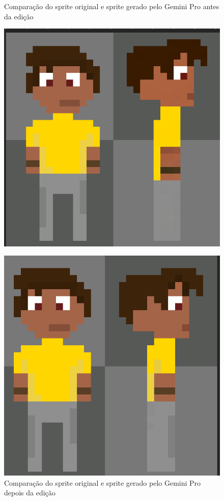\begin{figure}[htbp]
    \centering
    \begin{minipage}{0.45\textwidth}
        \centering
        \caption{\small Comparação do sprite original e sprite gerado pelo Gemini Pro antes da edição}
        \label{fig:pixelLabFixSideViewComparaAntes}
        \includegraphics[width=1\linewidth]{figs/pixelLab/dia3/comparacao.PNG}
    \end{minipage}\hfill
    \begin{minipage}{0.45\textwidth}
        \centering
        \caption{\small Comparação do sprite original e sprite gerado pelo Gemini Pro depois da edição}
        \label{fig:pixelLabFixSideViewComparaDepois}
        \includegraphics[width=1\linewidth]{figs/pixelLab/dia3/fix.PNG}

\end{minipage}
\end{figure}
